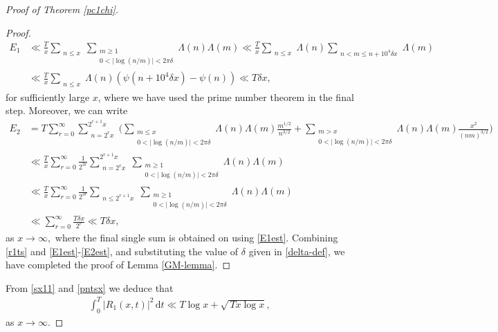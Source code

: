 \documentclass[pdflatex]{sn-jnl}%
\newcommand{\dx}{\mathrm{d}}
\theoremstyle{sltheorems}
\theoremstyle{plainrem}
\theoremstyle{definition}
\begin{document}
\begin{proof}[Proof of Theorem \ref{pc1chi}]
\begin{proof}
\begin{align}\label{E1est}
\nonumber
   E_1 &\ll
   \frac{T}{x} \sum_{ \substack{n \le  x}} \sum_{\substack{ m  \ge  1
\\ 0 <  \vert \log(n/m) \vert <2\pi \delta}}\!\!\!\!\! \Lambda(n) \Lambda(m)
    \ll 
    \frac{T}{x}
\sum_{\substack{n \le 
x } } \Lambda(n) 
\sum_{ \substack{n < m \le n+ 10^4 \delta x}}  \Lambda(m) 
   \\
   &\ll \frac{T}{x}
\sum_{\substack{n  \le 
x } } \Lambda(n) (\psi(n + 10^4 \delta x) -  \psi(n) )
   \ll  T \delta x,
\end{align}
for sufficiently large $x$, where we have used the prime number theorem in the final step.  
%
Moreover, we can write
\begin{align}\label{E2est}
   E_2 &= T
\sum_{ r = 0}^{\infty} \sum_{ \substack{n= 2^r x}}^{2^{r+1}x}
\Big(\sum_{\substack{ m \le x \\ 0 <  \vert \log(n/m) \vert <2\pi \delta}} 
\!\!\!\!\!\!\!\!\!\!\Lambda(n) \Lambda(m) \frac{m^{1/2}}{n^{3/2}} 
+
\!\!\!\!\!\!
\sum_{\substack{m > x \\
0 <  \vert \log(n/m) \vert <2\pi \delta}} 
\!\!\!\!\!\!\!\!\!\Lambda(n) \Lambda(m) \frac{x^2}{(nm)^{3/2}}
\Big) \nonumber\\ 
& \ll 
   \frac{T}{x} \sum_{r=0}^{\infty} 
    \frac{1}{2^{3r}} \sum_{ \substack{n= 2^r x}}^{2^{r+1}x}
\sum_{\substack{ m  \ge  1 
\\ 0 <  \vert \log(n/m) \vert <2\pi \delta}} \Lambda(n) \Lambda(m)
\nonumber\\ 
& \ll 
   \frac{T}{x} \sum_{r=0}^{\infty} 
    \frac{1}{2^{3r}} 
    \sum_{\substack{n \le  2^{r+1} x}}
\sum_{\substack{ m  \ge  1 
\\ 0 <  \vert \log(n/m) \vert <2\pi \delta}} \Lambda(n) \Lambda(m)
\nonumber\\ 
& \ll  \sum_{r=0}^{\infty}  \frac{T \delta x}{2^{r}} 
   \ll T \delta x,
\end{align}
as $x \to \infty,$
 where the final single sum  is obtained on using \eqref{E1est}.
Combining  \eqref{r1ts} and \eqref{E1est}-\eqref{E2est}, and substituting the value of $\delta$ 
given in \eqref{delta-def}, we have completed the proof of Lemma \ref{GM-lemma}.
\end{proof}



{}From \eqref{sx11} and \eqref{pntsx} we deduce that
\begin{align}\label{eqn3899}
\int_{0}^T  \vert R_1(x,t) \vert ^2 \, \dx t 
  \ll  T \log x + \sqrt{\, Tx\log x},
\end{align}
as $x \to \infty$.


\end{proof}
\end{document}
